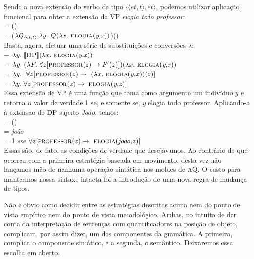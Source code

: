 \n Sendo a nova extensão do verbo de tipo $\langle \langle et,t\rangle,et\rangle$, podemos utilizar aplicação funcional para obter a
extensão do VP \textit{elogia todo professor}:\\

\n {} = ()\\

\n {} = ($\lambda Q_{\langle et,t\rangle}.\lambda y.\
Q(\lambda x.\ \text{\textsc{elogia}(\textit{y,x})})$)()\\

\n Basta, agora, efetuar uma série de substituições e conversões-$\lambda$:\\

\n {} = $\lambda y.\ \llbracket \text{DP} \rrbracket(\lambda x.\ \text{\textsc{elogia}(\textit{y,x})})$\\

\n {} = $\lambda y.\ (\lambda F.\
\forall z [\text{\textsc{professor}(\textit{z})} \rightarrow F'(z)])(\lambda
x.\ \text{\textsc{elogia}(\textit{y,x})})$\\

\n {} = $\lambda y.\ \ \forall z [\predica{professor}{z} \rightarrow\ (\lambda x.\ \predica{elogia}{y,x})(z)]$\\

\n \den{VP} = $\lambda y.\ \forall z [\predica{professor}{z} \rightarrow\ \predica{elogia}{y,z}]$\\

\n Essa extensão de VP é uma função que toma como argumento um indivíduo $y$ e retorna o valor de verdade 1 se, e somente se, $y$ elogia todo professor. Aplicando-a à extensão do DP sujeito \textit{João}, temos:\\

\n \den{S} = \den{VP}()\\

\n \den{DP} = \textit{joão}\\

\n {} = 1 \textit{sse} $\forall z [\predica{professor}{z} \rightarrow\ \predica{elogia}{joão,z}]$\\

\n Essas são, de fato, as condições de verdade que desejávamos. Ao
contrário do que ocorreu com a primeira estratégia baseada em
movimento, desta vez não lançamos mão de nenhuma operação sintática nos moldes de AQ. O custo para mantermos nossa sintaxe
intacta foi a introdução de uma nova regra de mudança de tipos.

Não é óbvio como decidir entre as estratégias descritas acima nem do ponto de vista empírico nem do ponto de vista metodológico. Ambas, no intuito de dar conta da interpretação de sentenças com quantificadores na posição de objeto, complicam, por assim dizer, um dos componentes da gramática. A primeira, complica o componente sintático, e a segunda, o semântico. Deixaremos essa escolha em aberto.

